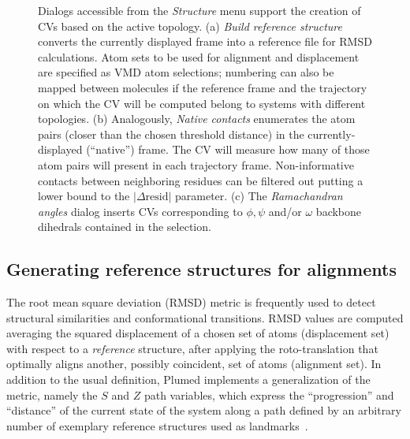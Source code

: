 \documentclass[preprint,review,11pt]{elsarticle}
\begin{document}
\begin{figure}
  \caption{Dialogs accessible from the \emph{Structure} menu support
    the creation of CVs based on the active topology. (a) \emph{Build
      reference structure} converts the currently displayed frame into
    a reference file for RMSD calculations.  Atom sets to be used for
    alignment and displacement are specified as VMD atom selections;
    numbering can also be mapped between molecules if the reference
    frame and the trajectory on which the CV will be computed belong
    to systems with different topologies. (b) Analogously,
    \emph{Native contacts} enumerates  the atom pairs (closer
    than the chosen threshold distance) in the currently-displayed
    (``native'') frame. The CV will measure how many of
    those atom pairs will present in each trajectory frame. 
    Non-informative contacts between neighboring residues can be
    filtered out putting a lower bound to the $| \Delta \mbox{resid}
    |$ parameter. (c) The \emph{Ramachandran angles} dialog inserts
    CVs corresponding to $\phi, \psi$ and/or $\omega$ backbone
    dihedrals contained in the selection.}\label{fig:structure}
\end{figure}

\subsection{Generating reference structures for alignments}


The root mean square deviation (RMSD) metric is frequently used to
detect structural similarities and conformational transitions.  RMSD
values are computed averaging the squared displacement of a chosen set
of atoms (displacement set) with respect to a \emph{reference}
structure,  after applying the roto-translation that optimally
aligns another, possibly coincident, set of atoms (alignment set).  In
addition to the usual definition, Plumed implements a generalization
of the metric, namely the $S$ and $Z$ path variables, which express
the ``progression'' and ``distance'' of the current state of the
system along a path defined by an arbitrary number of exemplary
reference structures used as
landmarks~\cite{Branduardi_Gervasio_Parrinello_2007}.


\end{document}

